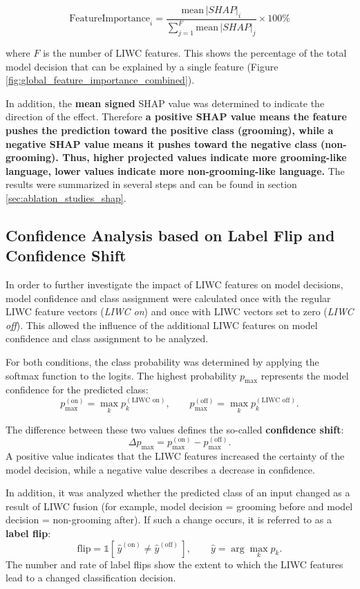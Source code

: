 \[
\text{FeatureImportance}_{i} = \frac{\text{mean}\,|SHAP|_{i}}{\sum_{j=1}^{F} \text{mean}\,|SHAP|_{j}} \times 100 \%
\]

where \(F\) is the number of LIWC features. This shows the percentage of the total model decision that can be explained by a single feature (Figure \ref{fig:global_feature_importance_combined}).

In addition, the \textbf{mean signed} SHAP value was determined to indicate the direction of the effect.
Therefore \textbf{a positive SHAP value means the feature pushes the prediction toward the positive class (grooming), while a negative SHAP value means it pushes toward the negative class (non-grooming). Thus, higher projected values indicate more grooming-like language, lower values indicate more non-grooming-like language.}
The results were summarized in several steps and can be found in section \ref{sec:ablation_studies_shap}.



\subsection{Confidence Analysis based on Label Flip and Confidence Shift}

In order to further investigate the impact of LIWC features on model decisions, model confidence and class assignment were calculated once with the regular LIWC feature vectors (\emph{LIWC on}) and once with LIWC vectors set to zero (\emph{LIWC off}). This allowed the influence of the additional LIWC features on model confidence and class assignment to be analyzed.

For both conditions, the class probability was determined by applying the softmax function to the logits. The highest probability \(p_{\max}\) represents the model confidence for the predicted class:
\[
p_{\max}^{(\text{on})} = \max_k p_k^{(\text{LIWC on})}, \qquad
p_{\max}^{(\text{off})} = \max_k p_k^{(\text{LIWC off})}.
\]

The difference between these two values defines the so-called \textbf{confidence shift}:
\[
\Delta p_{\max} = p_{\max}^{(\text{on})} - p_{\max}^{(\text{off})}.
\]
A positive value indicates that the LIWC features increased the certainty of the model decision, while a negative value describes a decrease in confidence.

In addition, it was analyzed whether the predicted class of an input changed as a result of LIWC fusion (for example, model decision = grooming before and model decision = non-grooming after). If such a change occurs, it is referred to as a \textbf{label flip}:
\[
\text{flip} = \mathbb{1}\!\left[\,\hat{y}^{(\text{on})} \neq \hat{y}^{(\text{off})}\,\right], 
\qquad
\hat{y} = \arg\max_k p_k.
\]
The number and rate of label flips show the extent to which the LIWC features lead to a changed classification decision.

